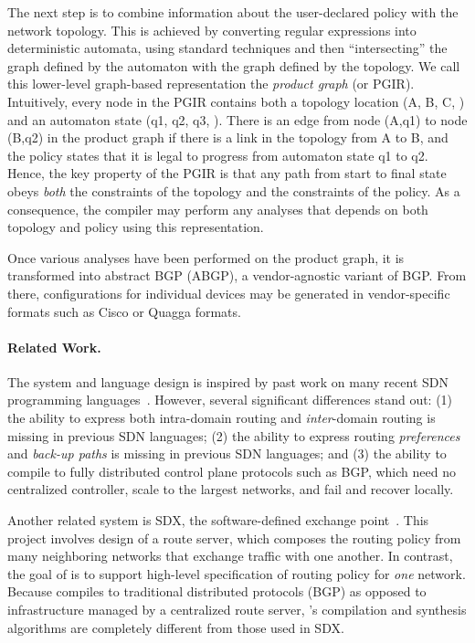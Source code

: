 The next step is to combine information about
the user-declared policy with the network topology.
This is achieved by converting regular expressions into deterministic
automata, using standard techniques and then ``intersecting'' the graph
defined by the automaton with the graph defined by the topology.
We call this lower-level graph-based representation the \emph{product graph} (or PGIR).
Intuitively, every node in the PGIR contains both a topology location
(A, B, C, \etc) and an automaton state (q1, q2, q3, \etc).  There is an
edge from node (A,q1) to node (B,q2) in the product graph if there is
a link in the topology from A to B, and the \Propane policy states that
it is legal to progress from automaton state q1 to q2.  Hence,
the key property of the PGIR is that any path from start to final state
obeys \emph{both} the constraints of the topology and the constraints
of the policy.  As a consequence, the compiler may perform any
analyses that depends on both topology and policy using this representation.  

Once various analyses have been performed on the product graph, it is
transformed into abstract BGP (ABGP), a vendor-agnostic variant of BGP.
From there, configurations for individual devices may be generated in
vendor-specific formats such as Cisco or Quagga formats.

\paragraph*{Related Work.}
The \Propane system and language design is inspired by past work on many 
recent SDN programming
languages~\cite{frenetic,pyretic,flowlog,foster:merlin,netkat,kinetic,pga}.
However, several significant differences stand out:  (1) the ability to express
both intra-domain routing and \emph{inter}-domain routing is missing in
previous SDN languages;
(2) the ability to express routing \emph{preferences} and 
\emph{back-up paths} is missing in
previous SDN languages;
and (3) the ability to compile to fully distributed control plane
protocols such as BGP, which need no centralized controller,
scale to the largest networks, and fail and recover locally.

Another related system is SDX, the software-defined exchange 
point~\cite{sdx,isdx}. This project involves design of a route server, which 
composes the routing policy from
many neighboring networks that exchange traffic
with one another.
In contrast, the goal of \Propane is to support high-level 
specification of routing policy for \emph{one}
network.  Because
\Propane compiles to traditional distributed protocols (BGP) as opposed
to infrastructure managed by a centralized route server, 
\Propane's compilation and synthesis algorithms
are completely different from those used in SDX.

